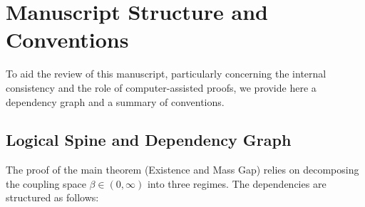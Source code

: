 \chapter{Manuscript Structure and Conventions}
\label{ch:meta_structure}

To aid the review of this manuscript, particularly concerning the internal consistency and the role of computer-assisted proofs, we provide here a dependency graph and a summary of conventions.

\section{Logical Spine and Dependency Graph}

The proof of the main theorem (Existence and Mass Gap) relies on decomposing the coupling space $\beta \in (0, \infty)$ into three regimes. The dependencies are structured as follows:

